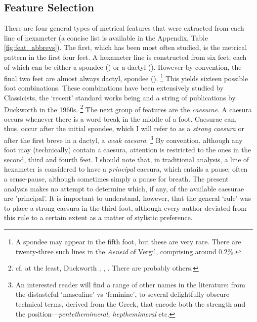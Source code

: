 \documentclass[11pt,a4paper]{scrartcl} %
\begin{document}
{\subsection{Feature Selection}
There are four general types of metrical features that were extracted from each line of hexameter (a concise list is available in the Appendix, Table \ref{fig:feat_abbrevs}). The first, which has been most often studied, is the metrical pattern in the first four feet. A hexameter line is constructed from six feet, each of which can be either a spondee (\metricsymbols{_ _}) or a dactyl (). However by convention, the final two feet are almost always dactyl, spondee ().%
\footnote{A spondee may appear in the fifth foot, but these are very rare. There are twenty-three such lines in the \textit{Aeneid} of Vergil, comprising around 0.2\%.}
This yields sixteen possible foot combinations. These combinations have been extensively studied by Classicists, the `recent' standard works being  and a string of publications by Duckworth in the 1960s.%
\footnote{cf, at the least, Duckworth , ,  . There are probably others.}
The next group of features are the \textit{caesurae}. A caesura occurs whenever there is a word break in the middle of a foot. Caesurae can, thus, occur after the initial spondee, which I will refer to as a \textit{strong caesura} or after the first breve in a dactyl, a \textit{weak caesura}.%
\footnote{An interested reader will find a range of other names in the literature: from the distasteful `masculine' vs `feminine', to several delightfully obscure technical terms, derived from the Greek, that encode both the strength and the position---\textit{pentethemimeral, hepthemimeral} etc.}
By convention, although any foot may (technically) contain a caesura, attention is restricted to the ones in the second, third and fourth feet. I should note that, in traditional analysis, a line of hexameter is considered to have a \textit{principal} caesura, which entails a pause; often a sense-pause, although sometimes simply a pause for breath. The present analysis makes no attempt to determine which, if any, of the available caesurae are 'principal'. It is important to understand, however, that the general `rule' was to place a strong caesura in the third foot, although every author deviated from this rule to a certain extent as a matter of stylistic preference.

}
\end{document}
